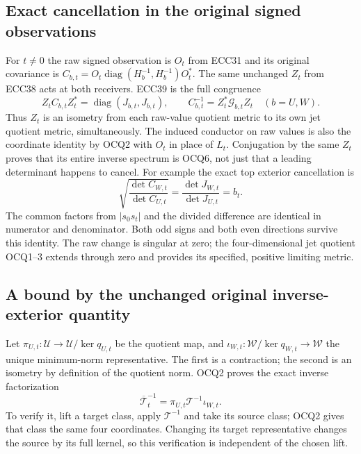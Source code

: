 \documentclass[11pt]{article}
\newcommand{\diag}{\operatorname{diag}}
\begin{document}
\subsection{Exact cancellation in the original signed observations}
For $t\ne0$ the raw signed observation is $O_t$ from ECC31 and its
original covariance is $C_{b,t}=O_t\diag(H_b^{-1},H_b^{-1})O_t^*$.
The same unchanged $Z_t$ from ECC38 acts at both receivers. ECC39 is
the full congruence
\[
 Z_tC_{b,t}Z_t^*=\diag(J_{b,t},J_{b,t}),\qquad
 C_{b,t}^{-1}=Z_t^*\mathcal G_{b,t}Z_t\quad(b=U,W).
 \tag{OCQ8}
\]
Thus $Z_t$ is an isometry from each raw-value quotient metric to its
own jet quotient metric, simultaneously. The induced conductor on raw
values is also the coordinate identity by OCQ2 with $O_t$ in place
of $L_t$. Conjugation by the same $Z_t$ proves that its entire inverse
spectrum is OCQ6, not just that a leading determinant happens to cancel.
For example the exact top exterior cancellation is
\[
 \sqrt{\frac{\det C_{W,t}}{\det C_{U,t}}}
 =\frac{\det J_{W,t}}{\det J_{U,t}}=b_t.
 \tag{OCQ9}
\]
The common factors from $|s_0s_t|$ and the divided difference are
identical in numerator and denominator. Both odd signs and both even
directions survive this identity. The raw change is singular at zero;
the four-dimensional jet quotient OCQ1--3 extends through zero and
provides its specified, positive limiting metric.

\subsection{A bound by the unchanged original inverse-exterior quantity}
Let $\pi_{U,t}:\mathcal U\to\mathcal U/\ker q_{U,t}$ be the
quotient map, and $\iota_{W,t}:\mathcal W/\ker q_{W,t}\to\mathcal W$
the unique minimum-norm representative. The first is a contraction;
the second is an isometry by definition of the quotient norm. OCQ2
proves the exact inverse factorization
\[
 \overline{\mathcal T}_t^{-1}
   =\pi_{U,t}\mathcal T^{-1}\iota_{W,t}.
 \tag{OCQ10}
\]
To verify it, lift a target class, apply $\mathcal T^{-1}$ and take
its source class; OCQ2 gives that class the same four coordinates.
Changing its target representative changes the source by its full
kernel, so this verification is independent of the chosen lift.
\end{document}
